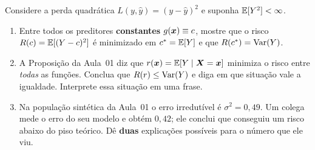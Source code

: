 \documentclass[11pt,a4paper]{article}
\begin{document}
\begin{exercicio}
Considere a perda quadrática $L(y,\hat y)=(y-\hat y)^2$ e suponha
$\mathbb{E}[Y^2]<\infty$.
\begin{enumerate}[label=(\alph*),leftmargin=1.1cm]
  \item Entre todos os preditores \textbf{constantes} $g(\bm{x})\equiv c$, mostre que o
        risco $R(c)=\mathbb{E}[(Y-c)^2]$ é minimizado em $c^\ast=\mathbb{E}[Y]$ e que
        $R(c^\ast)=\operatorname{Var}(Y)$.
  \item A Proposição da Aula~01 diz que $r(\bm{x})=\mathbb{E}[Y\mid\bm{X}=\bm{x}]$ minimiza o risco
        entre \emph{todas} as funções. Conclua que $R(r)\le\operatorname{Var}(Y)$ e diga
        em que situação vale a igualdade. Interprete essa situação em uma frase.
  \item Na população sintética da Aula~01 o erro irredutível é
        $\sigma^2=0{,}49$. Um colega mede o erro do seu modelo e obtém $0{,}42$;
        ele conclui que conseguiu um risco abaixo do piso teórico. Dê \textbf{duas}
        explicações possíveis para o número que ele viu.
\end{enumerate}
\end{exercicio}
\end{document}
